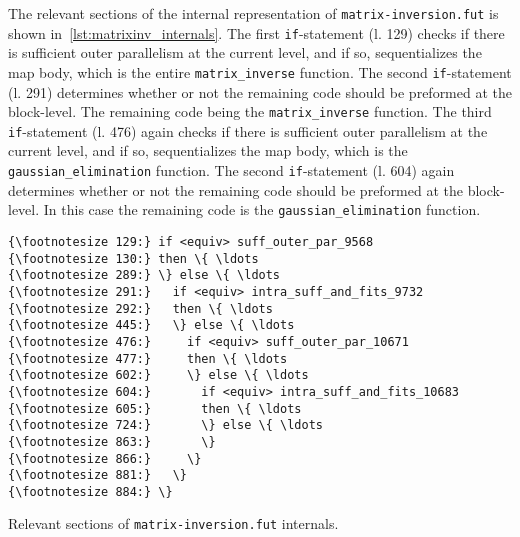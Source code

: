\documentclass{article}
\begin{document}
\vspace{1em}

\noindent
The relevant sections of the internal representation of
\verb|matrix-inversion.fut| is shown in~\cref{lst:matrixinv_internals}.
The first \texttt{if}-statement (l. 129) checks if there is sufficient outer
parallelism at the current level, and if so, sequentializes the map body, which
is the entire \verb|matrix_inverse| function.
The second \texttt{if}-statement (l. 291) determines whether or not the
remaining code should be preformed at the block-level. The
remaining code being the \verb|matrix_inverse| function.
The third \texttt{if}-statement (l. 476) again checks if there is sufficient
outer parallelism at the current level, and if so, sequentializes the map body,
which is the \verb|gaussian_elimination| function.
The second \texttt{if}-statement (l. 604) again determines whether or not the
remaining code should be preformed at the block-level. In this case the
remaining code is the \verb|gaussian_elimination| function.

\begin{listing}[t]
    \begin{Verbatim}[frame=single,commandchars=\\\{\}]
{\footnotesize 129:} if <equiv> suff_outer_par_9568
{\footnotesize 130:} then \{ \ldots
{\footnotesize 289:} \} else \{ \ldots
{\footnotesize 291:}   if <equiv> intra_suff_and_fits_9732
{\footnotesize 292:}   then \{ \ldots
{\footnotesize 445:}   \} else \{ \ldots
{\footnotesize 476:}     if <equiv> suff_outer_par_10671
{\footnotesize 477:}     then \{ \ldots
{\footnotesize 602:}     \} else \{ \ldots
{\footnotesize 604:}       if <equiv> intra_suff_and_fits_10683
{\footnotesize 605:}       then \{ \ldots
{\footnotesize 724:}       \} else \{ \ldots
{\footnotesize 863:}       \}
{\footnotesize 866:}     \}
{\footnotesize 881:}   \}
{\footnotesize 884:} \}
    \end{Verbatim}
    \caption{Relevant sections of \texttt{matrix-inversion.fut} internals.}
    \label{lst:matrixinv_internals}
\end{listing}
\end{document}
